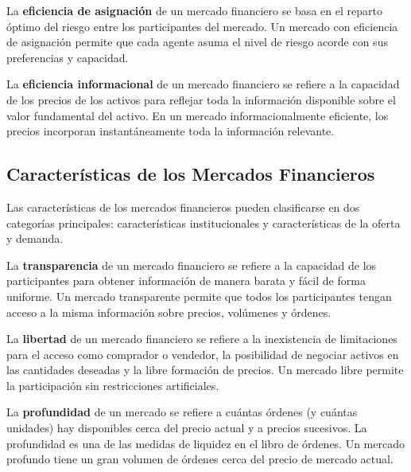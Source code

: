 \begin{definicion}
La \textbf{eficiencia de asignación} de un mercado financiero se basa en el reparto óptimo del riesgo entre los participantes del mercado. Un mercado con eficiencia de asignación permite que cada agente asuma el nivel de riesgo acorde con sus preferencias y capacidad.
\end{definicion}

\begin{definicion}
La \textbf{eficiencia informacional} de un mercado financiero se refiere a la capacidad de los precios de los activos para reflejar toda la información disponible sobre el valor fundamental del activo. En un mercado informacionalmente eficiente, los precios incorporan instantáneamente toda la información relevante.
\end{definicion}

\subsection{Características de los Mercados Financieros}

Las características de los mercados financieros pueden clasificarse en dos categorías principales: características institucionales y características de la oferta y demanda.

\begin{definicion}[Transparencia]
La \textbf{transparencia} de un mercado financiero se refiere a la capacidad de los participantes para obtener información de manera barata y fácil de forma uniforme. Un mercado transparente permite que todos los participantes tengan acceso a la misma información sobre precios, volúmenes y órdenes.
\end{definicion}

\begin{definicion}[Libertad]
La \textbf{libertad} de un mercado financiero se refiere a la inexistencia de limitaciones para el acceso como comprador o vendedor, la posibilidad de negociar activos en las cantidades deseadas y la libre formación de precios. Un mercado libre permite la participación sin restricciones artificiales.
\end{definicion}

\begin{definicion}[Profundidad]
La \textbf{profundidad} de un mercado se refiere a cuántas órdenes (y cuántas unidades) hay disponibles cerca del precio actual y a precios sucesivos. La profundidad es una de las medidas de liquidez en el libro de órdenes. Un mercado profundo tiene un gran volumen de órdenes cerca del precio de mercado actual.
\end{definicion}

